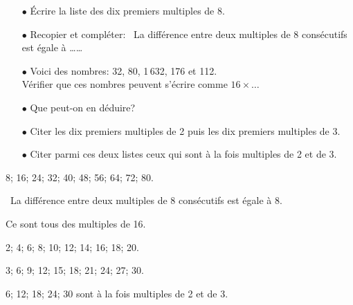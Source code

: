 \begin{myenumerate}
\item \begin{itemize}
\item[$\bullet$] \'Ecrire la liste des dix premiers multiples de 8.
\item[$\bullet$] Recopier et compléter: \og\ La différence entre deux multiples de 8 consécutifs est égale à \ldots\ldots \fg
\end{itemize}
\item \begin{itemize}
\item[$\bullet$] Voici des nombres: 32, 80, 1\,632, 176 et 112.\\Vérifier que ces nombres peuvent s'écrire comme $16\times\dots$
\item[$\bullet$] Que peut-on en déduire?
\end{itemize}
\item  \begin{itemize}
\item[$\bullet$] Citer les dix premiers multiples de 2 puis les dix premiers multiples de 3.
\item[$\bullet$] Citer parmi ces deux listes ceux qui sont à la fois multiples de 2 et de 3.
\end{itemize}
\end{myenumerate}
\begin{myenumerate}
  \item 8; 16; 24; 32; 40; 48; 56; 64; 72; 80.\par \og\ La différence entre deux multiples de 8 consécutifs est égale à 8\fg.
  \item {}\kern1cm\kern1cm\kern1cm\kern1cm\par Ce sont tous des multiples de 16.
  \item 2; 4; 6; 8; 10; 12; 14; 16; 18; 20.\par 3; 6; 9; 12; 15; 18; 21; 24; 27; 30.\par6; 12; 18; 24; 30 sont à la fois multiples de 2 et de 3.
\end{myenumerate}